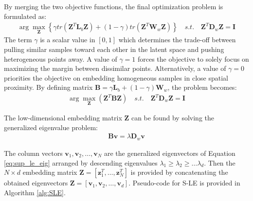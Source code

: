 By merging the two objective functions, the final optimization problem is formulated as:
\begin{align}
	\arg\max_{\bm{Z}} \left \{  \gamma tr(\bm{Z}^{T}\bm{L}_{b}\bm{Z}) + (1- \gamma)tr(\bm{Z}^{T}\bm{W}_{w}\bm{Z}) \right \} \quad s.t. \quad \bm{Z}^{T}\bm{D}_{w}\bm{Z} = \bm{I}
\end{align}
The term $\gamma$ is a scalar value in $[0,1]$ which determines the trade-off between pulling similar samples toward each other in the latent space and pushing heterogeneous points away.  A value of $\gamma = 1$ forces the objective to solely focus on maximizing the margin between dissimilar points.  Alternatively, a value of $\gamma = 0$ priorities the objective on embedding homogeneous samples in close spatial proximity. By defining matrix $\bm{B} = \gamma \bm{L}_{b} + (1 - \gamma)\bm{W}_{w}$, the problem becomes:
\begin{align}
	\arg\max_{\bm{Z}} \left ( \bm{Z}^{T}\bm{B}\bm{Z}  \right ) \quad s.t. \quad \bm{Z}^{T}\bm{D}_{w}\bm{Z} = \bm{I}
\end{align}

The low-dimensional embedding matrix $\bm{Z}$ can be found by solving the generalized eigenvalue problem:
\begin{align}
	\bm{B}\bm{v} = \lambda \bm{D}_{w}\bm{v} \label{eq:sup_le_eig}
\end{align}

The column vectors $\bm{v}_{1}, \bm{v}_{2}, \dots, \bm{v}_{N}$ are the generalized eigenvectors of 
Equation \ref{eq:sup_le_eig} arranged by descending eigenvalues $\lambda_{1} \geq \lambda_{2} \geq \dots \lambda_{d}$.  Then the $N \times d$ embedding matrix $\bm{Z} =  [ \bm{z}^{T}_{1}, \dots, \bm{z}^{T}_{N}]$ is provided by concatenating the obtained eigenvectors $\bm{Z} = [\bm{v}_{1}, \bm{v}_{2}, \dots, \bm{v}_{d}]$.  Pseudo-code for S-LE is provided in Algorithm \ref{alg:SLE}.

